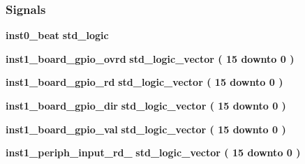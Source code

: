 \subsubsection*{Signals}
 \begin{DoxyCompactItemize}
\item 
{\bf inst0\+\_\+beat} {\bfseries \textcolor{comment}{std\+\_\+logic}\textcolor{vhdlchar}{ }} 
\item 
{\bf inst1\+\_\+board\+\_\+gpio\+\_\+ovrd} {\bfseries \textcolor{comment}{std\+\_\+logic\+\_\+vector}\textcolor{vhdlchar}{ }\textcolor{vhdlchar}{(}\textcolor{vhdlchar}{ }\textcolor{vhdlchar}{ } \textcolor{vhdldigit}{15} \textcolor{vhdlchar}{ }\textcolor{keywordflow}{downto}\textcolor{vhdlchar}{ }\textcolor{vhdlchar}{ } \textcolor{vhdldigit}{0} \textcolor{vhdlchar}{ }\textcolor{vhdlchar}{)}\textcolor{vhdlchar}{ }} 
\item 
{\bf inst1\+\_\+board\+\_\+gpio\+\_\+rd} {\bfseries \textcolor{comment}{std\+\_\+logic\+\_\+vector}\textcolor{vhdlchar}{ }\textcolor{vhdlchar}{(}\textcolor{vhdlchar}{ }\textcolor{vhdlchar}{ } \textcolor{vhdldigit}{15} \textcolor{vhdlchar}{ }\textcolor{keywordflow}{downto}\textcolor{vhdlchar}{ }\textcolor{vhdlchar}{ } \textcolor{vhdldigit}{0} \textcolor{vhdlchar}{ }\textcolor{vhdlchar}{)}\textcolor{vhdlchar}{ }} 
\item 
{\bf inst1\+\_\+board\+\_\+gpio\+\_\+dir} {\bfseries \textcolor{comment}{std\+\_\+logic\+\_\+vector}\textcolor{vhdlchar}{ }\textcolor{vhdlchar}{(}\textcolor{vhdlchar}{ }\textcolor{vhdlchar}{ } \textcolor{vhdldigit}{15} \textcolor{vhdlchar}{ }\textcolor{keywordflow}{downto}\textcolor{vhdlchar}{ }\textcolor{vhdlchar}{ } \textcolor{vhdldigit}{0} \textcolor{vhdlchar}{ }\textcolor{vhdlchar}{)}\textcolor{vhdlchar}{ }} 
\item 
{\bf inst1\+\_\+board\+\_\+gpio\+\_\+val} {\bfseries \textcolor{comment}{std\+\_\+logic\+\_\+vector}\textcolor{vhdlchar}{ }\textcolor{vhdlchar}{(}\textcolor{vhdlchar}{ }\textcolor{vhdlchar}{ } \textcolor{vhdldigit}{15} \textcolor{vhdlchar}{ }\textcolor{keywordflow}{downto}\textcolor{vhdlchar}{ }\textcolor{vhdlchar}{ } \textcolor{vhdldigit}{0} \textcolor{vhdlchar}{ }\textcolor{vhdlchar}{)}\textcolor{vhdlchar}{ }} 
\item 
{\bf inst1\+\_\+periph\+\_\+input\+\_\+rd\+\_} {\bfseries \textcolor{comment}{std\+\_\+logic\+\_\+vector}\textcolor{vhdlchar}{ }\textcolor{vhdlchar}{(}\textcolor{vhdlchar}{ }\textcolor{vhdlchar}{ } \textcolor{vhdldigit}{15} \textcolor{vhdlchar}{ }\textcolor{keywordflow}{downto}\textcolor{vhdlchar}{ }\textcolor{vhdlchar}{ } \textcolor{vhdldigit}{0} \textcolor{vhdlchar}{ }\textcolor{vhdlchar}{)}\textcolor{vhdlchar}{ }} 

\end{DoxyCompactItemize}
